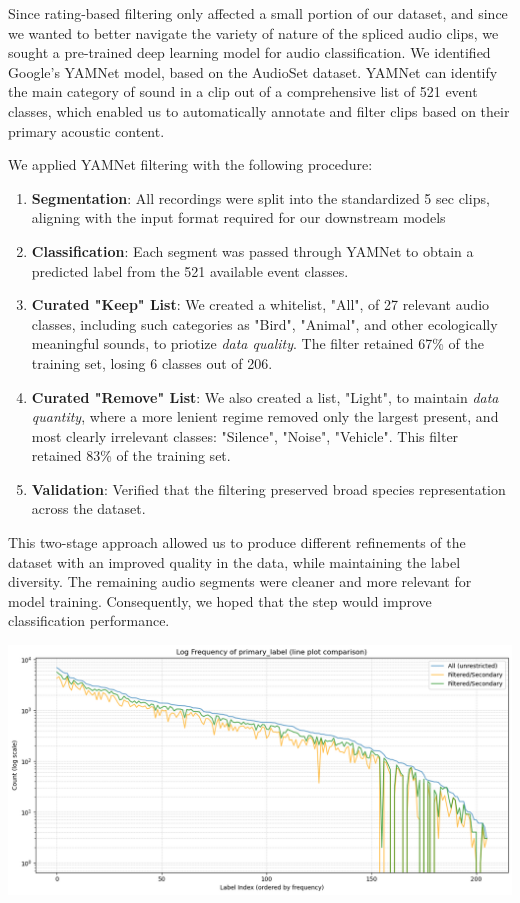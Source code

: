 \documentclass[10pt]{article}
\begin{document}
Since rating-based filtering only affected a small portion of our dataset, and since we wanted to better navigate the variety of nature of the spliced audio clips, we sought a pre-trained deep learning model for audio classification. We identified Google's YAMNet model,  based on the AudioSet dataset. YAMNet can identify the main category of sound in a clip out of a comprehensive list of 521 event classes, which enabled us to automatically annotate and filter clips based on their primary acoustic content.

We applied YAMNet filtering with the following procedure:

\begin{enumerate}
  \item \textbf{Segmentation}: All recordings were split into the standardized 5 sec clips, aligning with the input format required for our downstream models
  \item \textbf{Classification}: Each segment was passed through YAMNet to obtain a predicted label from the 521 available event classes.
  \item \textbf{Curated "Keep" List}: We created a whitelist, "All", of 27 relevant audio classes, including such categories as "Bird", "Animal", and other ecologically meaningful sounds, to priotize \textit{data quality}. The filter retained 67\% of the training set, losing 6 classes out of 206.
  \item \textbf{Curated "Remove" List}: We also created a list, "Light", to maintain \textit{data quantity}, where a more lenient regime removed only the largest present, and most clearly irrelevant classes: "Silence", "Noise", "Vehicle". This filter retained 83\% of the training set.
  \item \textbf{Validation}: Verified that the filtering preserved broad species representation across the dataset.
\end{enumerate}

\begin{minipage}{0.48\linewidth}
This two-stage approach allowed us to produce different refinements of the dataset with an improved quality in the data, while maintaining the label diversity. The remaining audio segments were cleaner and more relevant for model training. Consequently, we hoped that the step would improve classification performance.
\end{minipage}
\hfill
\begin{minipage}{0.48\linewidth}
  \includegraphics[width=\linewidth]{img/primary_yamnet_filtering.png}
\end{minipage}
\end{document}
